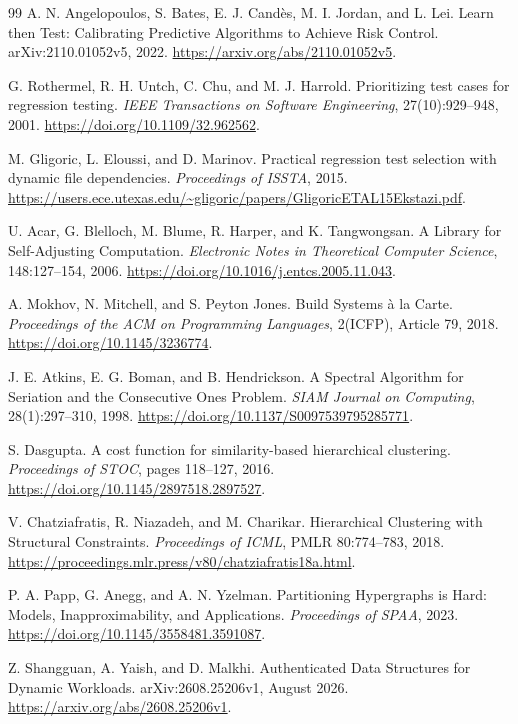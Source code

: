 \begin{thebibliography}{99}
 A. N. Angelopoulos, S. Bates, E. J. Cand\`es, M. I. Jordan, and L. Lei. Learn then Test: Calibrating Predictive Algorithms to Achieve Risk Control. arXiv:2110.01052v5, 2022. \url{https://arxiv.org/abs/2110.01052v5}.

 G. Rothermel, R. H. Untch, C. Chu, and M. J. Harrold. Prioritizing test cases for regression testing. \emph{IEEE Transactions on Software Engineering}, 27(10):929--948, 2001. \url{https://doi.org/10.1109/32.962562}.

 M. Gligoric, L. Eloussi, and D. Marinov. Practical regression test selection with dynamic file dependencies. \emph{Proceedings of ISSTA}, 2015. \url{https://users.ece.utexas.edu/~gligoric/papers/GligoricETAL15Ekstazi.pdf}.

 U. Acar, G. Blelloch, M. Blume, R. Harper, and K. Tangwongsan. A Library for Self-Adjusting Computation. \emph{Electronic Notes in Theoretical Computer Science}, 148:127--154, 2006. \url{https://doi.org/10.1016/j.entcs.2005.11.043}.

 A. Mokhov, N. Mitchell, and S. Peyton Jones. Build Systems \`a la Carte. \emph{Proceedings of the ACM on Programming Languages}, 2(ICFP), Article 79, 2018. \url{https://doi.org/10.1145/3236774}.

 J. E. Atkins, E. G. Boman, and B. Hendrickson. A Spectral Algorithm for Seriation and the Consecutive Ones Problem. \emph{SIAM Journal on Computing}, 28(1):297--310, 1998. \url{https://doi.org/10.1137/S0097539795285771}.

 S. Dasgupta. A cost function for similarity-based hierarchical clustering. \emph{Proceedings of STOC}, pages 118--127, 2016. \url{https://doi.org/10.1145/2897518.2897527}.

 V. Chatziafratis, R. Niazadeh, and M. Charikar. Hierarchical Clustering with Structural Constraints. \emph{Proceedings of ICML}, PMLR 80:774--783, 2018. \url{https://proceedings.mlr.press/v80/chatziafratis18a.html}.

 P. A. Papp, G. Anegg, and A. N. Yzelman. Partitioning Hypergraphs is Hard: Models, Inapproximability, and Applications. \emph{Proceedings of SPAA}, 2023. \url{https://doi.org/10.1145/3558481.3591087}.

 Z. Shangguan, A. Yaish, and D. Malkhi. Authenticated Data Structures for Dynamic Workloads. arXiv:2608.25206v1, August 2026. \url{https://arxiv.org/abs/2608.25206v1}.
\end{thebibliography}
